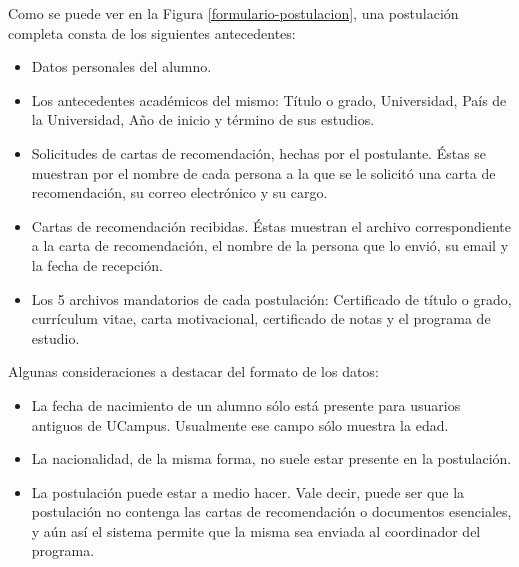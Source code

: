 Como se puede ver en la Figura \ref{formulario-postulacion}, una postulación
completa consta de los siguientes antecedentes:

\begin{itemize}
    \item Datos personales del alumno.
    \item Los antecedentes académicos del mismo: Título o grado, Universidad, País
    de la Universidad, Año de inicio y término de sus estudios.
    \item Solicitudes de cartas de recomendación, hechas por el postulante. Éstas se
    muestran por el nombre de cada persona a la que se le solicitó una carta de
    recomendación, su correo electrónico y su cargo.
    \item Cartas de recomendación recibidas. Éstas muestran el archivo
    correspondiente a la carta de recomendación, el nombre de la persona que lo
    envió, su email y la fecha de recepción.
    \item Los 5 archivos mandatorios de cada postulación: Certificado de título o
    grado, currículum vitae, carta motivacional, certificado de notas y el programa
    de estudio.
\end{itemize}

Algunas consideraciones a destacar del formato de los datos:

\begin{itemize}
    \item La fecha de nacimiento de un alumno sólo está presente para usuarios
    antiguos de UCampus. Usualmente ese campo sólo muestra la edad.
    \item La nacionalidad, de la misma forma, no suele estar presente en la
    postulación.
    \item La postulación puede estar a medio hacer. Vale decir, puede ser que la
    postulación no contenga las cartas de recomendación o documentos esenciales,
    y aún así el sistema permite que la misma sea enviada al coordinador del
    programa.
\end{itemize}